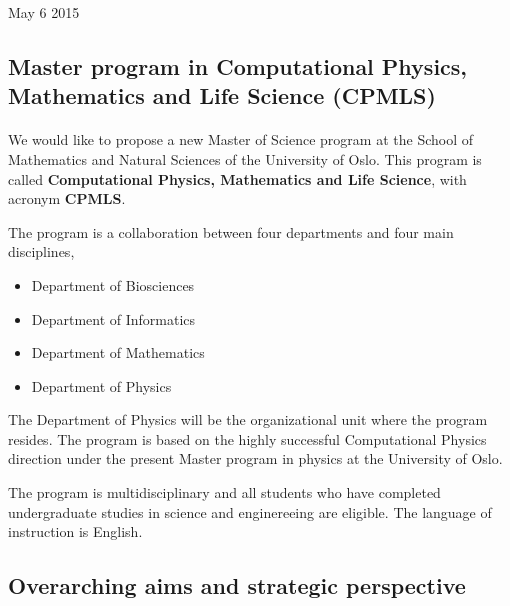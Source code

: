 \documentclass[%
twoside,                 %
final,                   %
10pt]{article}
\begin{document}
\begin{center} %
May 6 2015
\end{center}

\vspace{1cm}


\subsection{Master program in Computational Physics, Mathematics and Life Science (CPMLS)}

\paragraph{}
We would like to propose a new Master of Science program at the School of Mathematics and Natural Sciences of the University of Oslo. This program is called  \textbf{Computational Physics, Mathematics and Life Science}, with acronym  \textbf{CPMLS}. 

The program is a collaboration between four departments and four main disciplines,
\begin{itemize}
\item Department of Biosciences 

\item Department of Informatics

\item Department of Mathematics 

\item Department of Physics 
\end{itemize}

\noindent
The Department of Physics will be the organizational unit where the program resides. 
The program is based on the highly successful Computational Physics direction under the present Master program
in physics at the University of Oslo. 

The program is multidisciplinary and all students who have completed undergraduate studies in science and enginereeing are eligible.  The language of instruction is English.







\subsection{Overarching aims and strategic perspective}
\end{document}
